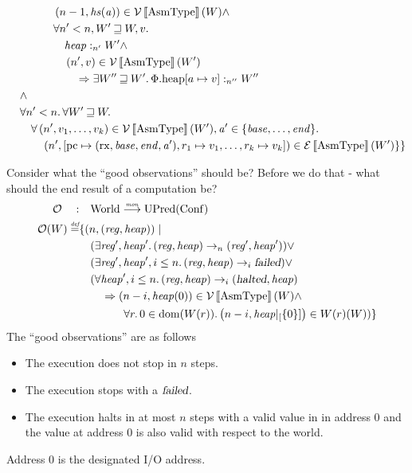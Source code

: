 \documentclass{article}
\newcommand{\update}[2]{[#1 \mapsto #2]}
\newcommand{\sem}[1]{\left\llbracket #1 \right\rrbracket}
\newcommand{\restrictfun}[1]{|_{#1}}
\newcommand{\monfun}{\stackrel{\textit{\tiny{mon}}}{\longrightarrow}}
\newcommand{\defeq}{\stackrel{\textit{\tiny{def}}}{=}}
\DeclareMathOperator{\dom}{dom}
\newcommand{\var}[1]{\mathit{#1}}
\newcommand{\pcreg}{\mathrm{pc}}
\newcommand{\addr}{\var{a}}
\newcommand{\start}{\var{base}}
\newcommand{\addrend}{\var{end}}
\newcommand{\reg}{\var{reg}}
\newcommand{\heapseg}{\var{hs}}
\newcommand{\heap}{\var{heap}}
\newcommand{\plainproj}[1]{\mathrm{#1}}
\newcommand{\memheap}[1][\Phi]{#1.\plainproj{heap}}
\newcommand{\failed}{\textsl{failed}}
\newcommand{\halted}{\textsl{halted}}
\newcommand{\future}{\mathbin{\sqsupseteq}}
\newcommand{\heapSat}[3][\heap]{#1 :_{#2} #3}
\newcommand{\asmType}{\plaindom{AsmType}}
\newcommand{\plaindom}[1]{\mathrm{#1}}
\newcommand{\Confs}{\plaindom{Conf}}
\newcommand{\Worlds}{\plaindom{World}}
\newcommand{\UPred}[1]{\plaindom{UPred}(#1)}
\newcommand{\intr}[2]{\mathcal{#1}\sem{#2}}
\newcommand{\valueintr}[1]{\intr{V}{#1}}
\newcommand{\exprintr}[1]{\intr{E}{#1}}
\newcommand{\stdvr}{\valueintr{\asmType}}
\newcommand{\stder}{\exprintr{\asmType}}
\newcommand{\observations}{\mathcal{O}}
\newcommand{\npair}[2][n]{\left(#1,#2 \right)}
\newcommand{\plainperm}[1]{\mathrm{#1}}
\newcommand{\exec}{\plainperm{rx}}
\newcommand{\step}[1][]{\rightarrow_{#1}}
\begin{document}
\begin{align*}
                   & \qquad \qquad   \npair[n-1]{\heapseg(\addr)} \in \stdvr(W) \land \\
                   & \qquad \qquad   \forall n' < n, W' \future W, v \ldotp \\
                   & \qquad \qquad \quad \heapSat{n'}{W'} \land \\
                   & \qquad \qquad \quad \npair[n']{v} \in \stdvr(W') \\
                   & \qquad \qquad \qquad  \Rightarrow \exists W'' \future W' \ldotp \heapSat[\memheap\update{a}{v}]{n''}{W''} \\
                   & \quad \land \\
                   & \quad \forall n' < n \ldotp \forall W' \future W \ldotp \\
                   & \qquad \forall \npair[n']{v_1,\dots,v_k} \in \stdvr(W'),\addr' \in \{\start, \dots, \addrend \} \ldotp \\
                   & \qquad \quad \npair[n']{[\pcreg \mapsto (\exec,\start,\addrend,\addr'), r_1 \mapsto v_1, \dots , r_k \mapsto v_k]} \in \stder(W') \}
\}
\end{align*}

Consider what the ``good observations'' should be? Before we do that - what should the end result of a computation be?
\begin{align*}
  \observations \quad : & \quad  \Worlds \monfun \UPred{\Confs} \\
  \observations (W) \defeq & \{ \npair{(\reg,\heap)} \mid \\
                           & \quad (\exists \reg', \heap' \ldotp (\reg,\heap) \step[n] (\reg',\heap')) \lor \\ %
                           & \quad (\exists \reg', \heap', i \leq n \ldotp (\reg,\heap) \step[i] \failed) \lor \\
                           & \quad (\forall \heap', i \leq n \ldotp (\reg,\heap) \step[i] (\halted,\heap)  \\
                           & \qquad \Rightarrow \npair[n-i]{\heap(0)} \in \stdvr(W) \land \\
                           & \qquad \qquad \forall r \ldotp 0 \in \dom(W(r)) \ldotp \npair[n-i]{\heap \restrictfun[\{0\}]} \in W(r)(W) )\}
\end{align*}
The ``good observations'' are as follows
\begin{itemize}
\item The execution does not stop in $n$ steps. 
\item The execution stops with a $\failed$.
\item The execution halts in at most $n$ steps with a valid value in in address 0 and the value at address 0 is also valid with respect to the world.
\end{itemize}
Address 0 is the designated I/O address.
\end{document}
